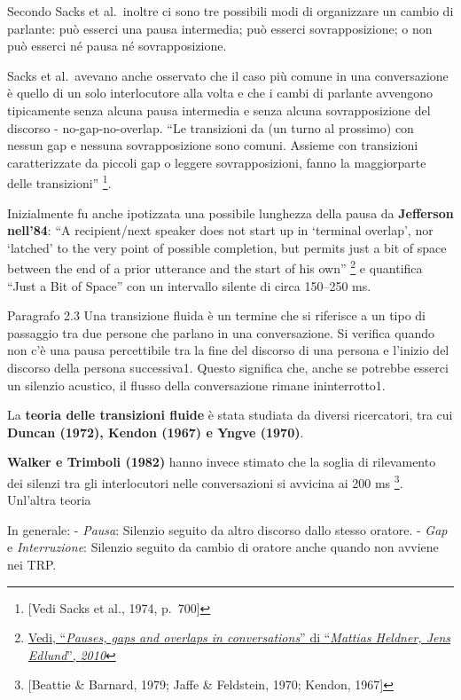 \documentclass[
]{article}
\begin{document}
Secondo Sacks et al.~inoltre ci sono tre possibili modi di organizzare un cambio di parlante: può esserci una pausa intermedia; può esserci sovrapposizione; o non può esserci né pausa né sovrapposizione.

Sacks et al.~avevano anche osservato che il caso più comune in una conversazione è quello di un solo interlocutore alla volta e che i cambi di parlante avvengono tipicamente senza alcuna pausa intermedia e senza alcuna sovrapposizione del discorso - no-gap-no-overlap. ``Le transizioni da (un turno al prossimo) con nessun gap e nessuna sovrapposizione sono comuni. Assieme con transizioni caratterizzate da piccoli gap o leggere sovrapposizioni, fanno la maggiorparte delle transizioni'' \footnote{{[}Vedi Sacks et al., 1974, p.~700{]}}.

Inizialmente fu anche ipotizzata una possibile lunghezza della pausa da \textbf{Jefferson nell'84}: ``A recipient/next speaker does not start up in `terminal overlap', nor `latched' to the very point of possible completion, but permits just a bit of space between the end of a prior utterance and the start of his own'' \footnote{\href{DOC/1-s2.0-S0095447010000628-main.pdf}{Vedi, ``\emph{Pauses, gaps and overlaps in conversations}'' di ``\emph{Mattias Heldner, Jens Edlund}'', \emph{2010}}} e quantifica ``Just a Bit of Space'' con un intervallo silente di circa 150--250 ms.

Paragrafo 2.3 Una transizione fluida è un termine che si riferisce a un tipo di passaggio tra due persone che parlano in una conversazione. Si verifica quando non c'è una pausa percettibile tra la fine del discorso di una persona e l'inizio del discorso della persona successiva1. Questo significa che, anche se potrebbe esserci un silenzio acustico, il flusso della conversazione rimane ininterrotto1.

La \textbf{teoria delle transizioni fluide} è stata studiata da diversi ricercatori, tra cui \textbf{Duncan (1972), Kendon (1967) e Yngve (1970)}.

\textbf{Walker e Trimboli (1982)} hanno invece stimato che la soglia di rilevamento dei silenzi tra gli interlocutori nelle conversazioni si avvicina ai 200 ms \footnote{{[}Beattie \& Barnard, 1979; Jaffe \& Feldstein, 1970; Kendon, 1967{]}}. Unl'altra teoria

In generale: - \emph{Pausa}: Silenzio seguito da altro discorso dallo stesso oratore. - \emph{Gap} e \emph{Interruzione}: Silenzio seguito da cambio di oratore anche quando non avviene nei TRP.
\end{document}
